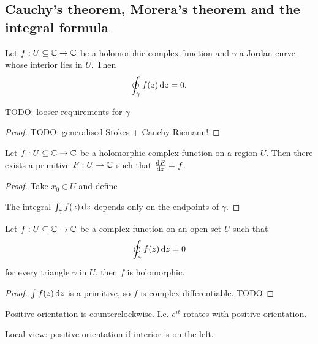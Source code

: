 \subsection{Cauchy's theorem, Morera's theorem and the integral formula}

\begin{theorem} \label{CauchyTheorem}
Let $f: U\subseteq \mathbb{C} \to \mathbb{C}$ be a holomorphic complex function and $\gamma$ a Jordan curve whose interior lies in $U$. Then
\[ \oint_\gamma f(z)\operatorname{d \!}{z} = 0. \]
\end{theorem}
TODO: looser requirements for $\gamma$
\begin{proof}
TODO: generalised Stokes + Cauchy-Riemann!
\end{proof}
\begin{corollary}
Let $f: U\subseteq \mathbb{C} \to \mathbb{C}$ be a holomorphic complex function on a region $U$. Then there exists a primitive $F: U\to \mathbb{C}$ such that $\od{F}{z} = f$.
\end{corollary}
\begin{proof}
Take $x_0\in U$ and define 

The integral $\int_\gamma f(z)\operatorname{d \!}{z}$ depends only on the endpoints of $\gamma$.
\end{proof}

\begin{theorem}
Let $f: U\subseteq \mathbb{C} \to \mathbb{C}$ be a complex function on an open set $U$ such that
\[ \oint_\gamma f(z) \operatorname{d \!}{z} = 0 \]
for every triangle $\gamma$ in $U$, then $f$ is holomorphic.
\end{theorem}
\begin{proof}
$\int f(z)\operatorname{d \!}{z}$ is a primitive, so $f$ is complex differentiable. TODO
\end{proof}


\begin{note}
Positive orientation is counterclockwise. I.e. $e^{it}$ rotates with positive orientation.

Local view: positive orientation if interior is on the left.
\end{note}

